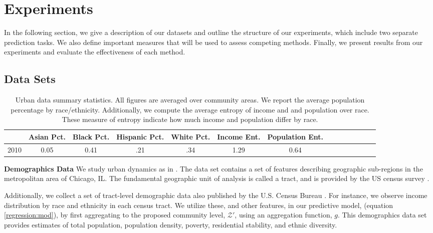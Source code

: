 \section{Experiments}
\label{sec:experiment}


In the following section, we give a description of our datasets and outline the structure of our experiments, which include two separate prediction tasks. We also define important measures that will be used to assess competing methods. Finally, we present results from our experiments and evaluate the effectiveness of each method.

\subsection{Data Sets}  \label{data:sets}
\scriptsize
\begin{center}
\begin{table}[h!]
\begin{tabular}{|c|c|c|c|c|c|c|c|c|c|c|c|c|c|} 
 \hline
  & Asian Pct. & Black Pct. & Hispanic Pct. & White Pct. & Income Ent. & Population Ent. \\
 \hline
 2010 & 0.05 & 0.41 & .21 & .34 & 1.29 &  0.64 \\
 \hline
\end{tabular}
\caption{Urban data summary statistics. All figures are averaged over community areas. We report the average population percentage by race/ethnicity. Additionally, we compute the average entropy of income and and population over race. These measure of entropy indicate how much income and population differ by race.}
\label{summaryStatsX}
\end{table}
\end{center}

\normalsize


\textbf{Demographics Data} We study urban dynamics as in \cite{wang:region}. The data set contains a set of features describing geographic sub-regions in the metropolitan area of Chicago, IL. The fundamental geographic unit of analysis is called a tract, and is provided by the US census survey \cite{census:2010}.

Additionally, we collect a set of tract-level demographic data also published by the U.S. Census Bureau \cite{census:2010}. For instance, we observe income distribution by race and ethnicity in each census tract. We utilize these, and other features, in our predictive model, (equation \ref{regression:mod}), by first aggregating to the proposed community level, $\mathcal{Z}'$, using an aggregation function, $g$. This demographics data set provides estimates of total population, population density, poverty, residential stability, and ethnic diversity.


